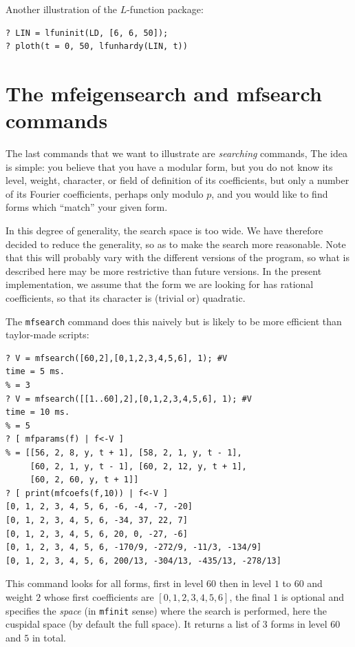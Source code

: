 \documentclass[11pt]{article}
\def\kbd#1{{\tt #1}}
\begin{document}
Another illustration of the $L$-function package:

\begin{verbatim}
? LIN = lfuninit(LD, [6, 6, 50]);
? ploth(t = 0, 50, lfunhardy(LIN, t))
\end{verbatim}


\medskip

\section{The mfeigensearch and mfsearch commands}

The last commands that we want to illustrate are \emph{searching} commands,
The idea is simple: you believe that you have a modular form, but you do not
know its level, weight, character, or field of definition of its
coefficients, but only a number of its Fourier coefficients, perhaps only
modulo $p$, and you would like to find forms which ``match'' your given form.

In this degree of generality, the search space is too wide. We have therefore
decided to reduce the generality, so as to make the search more reasonable.
Note that this will probably vary with the different versions of the program,
so what is described here may be more restrictive than future versions. In
the present implementation, we assume that the form we are looking for has
rational coefficients, so that its character is (trivial or) quadratic.

The \kbd{mfsearch} command does this naively but is likely to be more
efficient than taylor-made scripts:
\begin{verbatim}
? V = mfsearch([60,2],[0,1,2,3,4,5,6], 1); #V
time = 5 ms.
% = 3
? V = mfsearch([[1..60],2],[0,1,2,3,4,5,6], 1); #V
time = 10 ms.
% = 5
? [ mfparams(f) | f<-V ]
% = [[56, 2, 8, y, t + 1], [58, 2, 1, y, t - 1],
     [60, 2, 1, y, t - 1], [60, 2, 12, y, t + 1],
     [60, 2, 60, y, t + 1]]
? [ print(mfcoefs(f,10)) | f<-V ]
[0, 1, 2, 3, 4, 5, 6, -6, -4, -7, -20]
[0, 1, 2, 3, 4, 5, 6, -34, 37, 22, 7]
[0, 1, 2, 3, 4, 5, 6, 20, 0, -27, -6]
[0, 1, 2, 3, 4, 5, 6, -170/9, -272/9, -11/3, -134/9]
[0, 1, 2, 3, 4, 5, 6, 200/13, -304/13, -435/13, -278/13]
\end{verbatim}
This command looks for all forms, first in level $60$ then in level $1$ to $60$
and weight $2$ whose first coefficients are $[0,1,2,3,4,5,6]$, the final $1$
is optional and specifies the \emph{space} (in \kbd{mfinit} sense) where the
search is performed, here the cuspidal space (by default the full space). It
returns a list of $3$ forms in level $60$ and $5$ in total.
\end{document}
